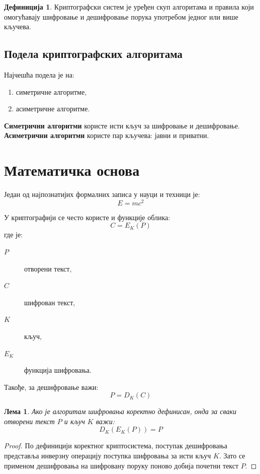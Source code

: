 \documentclass[12pt]{article}
\newtheorem{lemma}[theorem]{Лема}
\theoremstyle{definition}
\newtheorem{definition}[theorem]{Дефиниција}
\begin{document}
\begin{definition}
Криптографски систем је уређен скуп алгоритама и правила који омогућавају шифровање и дешифровање порука употребом једног или више кључева.
\end{definition}

\subsection{Подела криптографских алгоритама}

Најчешћа подела је на:
\begin{enumerate}
    \item симетричне алгоритме,
    \item асиметричне алгоритме.
\end{enumerate}

\noindent
\textbf{Симетрични алгоритми} користе исти кључ за шифровање и дешифровање.  
\textbf{Асиметрични алгоритми} користе пар кључева: јавни и приватни.

\section{Математичка основа}

Један од најпознатијих формалних записа у науци и техници је:
\[
E = mc^2
\]

У криптографији се често користе и функције облика:
\[
C = E_K(P)
\]
где је:
\begin{description}
    \item[$P$] отворени текст,
    \item[$C$] шифрован текст,
    \item[$K$] кључ,
    \item[$E_K$] функција шифровања.
\end{description}

Такође, за дешифровање важи:
\[
P = D_K(C)
\]

\begin{lemma}
Ако је алгоритам шифровања коректно дефинисан, онда за сваки отворени текст $P$ и кључ $K$ важи:
\[
D_K(E_K(P)) = P
\]
\end{lemma}

\begin{proof}
По дефиницији коректног криптосистема, поступак дешифровања представља инверзну операцију поступка шифровања за исти кључ $K$. Зато се применом дешифровања на шифровану поруку поново добија почетни текст $P$.
\end{proof}
\end{document}
